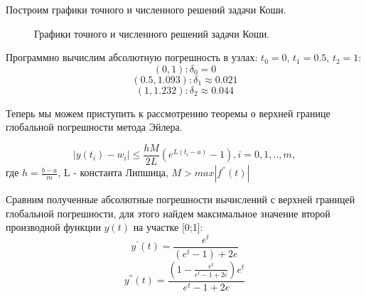 \documentclass[12pt,a4paper]{article}
\begin{document}
Построим графики точного и численного решений задачи Коши.
\begin{figure}[h]
	\caption{Графики точного и численного решений задачи Коши.}
	\label{fig:image}
\end{figure}

Программно вычислим абсолютную погрешность в узлах: $t_0 = 0$, $t_1 = 0.5$, $t_2 = 1$:
\begin{equation}
	(0, 1): \delta_0 = 0 	
\end{equation}
\begin{equation}
	(0.5, 1.093): \delta_1 \approx 0.021	
\end{equation}
\begin{equation}
	(1, 1.232): \delta_2 \approx 0.044	
\end{equation}


Теперь мы можем приступить к рассмотрению теоремы о верхней границе глобальной
погрешности метода Эйлера.

\begin{equation}
	\left| y(t_i) - w_i  \right| \leq \frac{hM}{2L}(e^{L(t_i - a)} - 1), i=0,1,..,m, 
\end{equation}
где $h = \frac{b - a}{m}$, L - константа Липшица, $M > max|f^{''}(t)|$

Сравним полученные абсолютные погрешности вычислений с верхней границей глобальной погрешности, для этого найдем максимальное значение второй производной функции $y(t)$ на участке [0;1]:
\begin{equation}\label{diff_1}
	y^{'}(t) = \frac{e^t}{(e^t - 1)+2e}
\end{equation}
\begin{equation}
	y^{''}(t) = \frac{(1 - \frac{e^t}{e^t - 1 + 2e})e^t}{e^t - 1 + 2e}
\end{equation}
\end{document}
